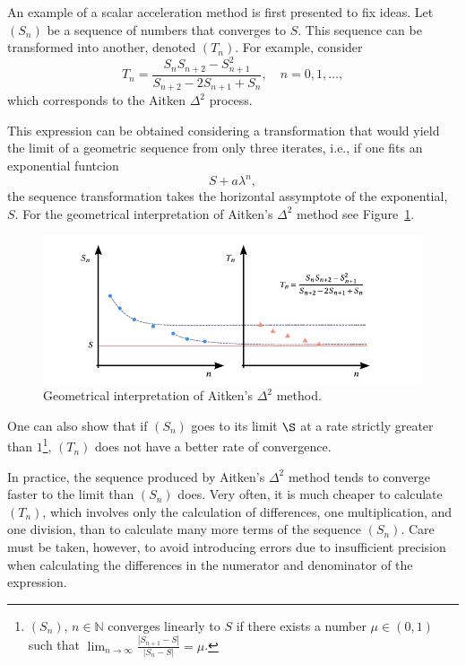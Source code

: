 An example of a scalar acceleration method is first presented to fix ideas.
Let \((S_n)\) be a sequence of numbers that converges to \(S\).
This sequence can be transformed into another, denoted \((T_n)\).
For example, consider
\begin{equation}
  T_n = \frac{S_n S_{n+2} - S^2_{n+1}}{S_{n+2}-2S_{n+1} + S_n},\quad n=0,1,\dots,
\end{equation}
which corresponds to the Aitken \(\Delta^2\) process.

This expression can be obtained considering a transformation that would yield the limit of a geometric sequence from only three iterates, i.e., if one fits an exponential funtcion
\begin{equation}
  S + a \lambda^n,
\end{equation}
the sequence transformation takes the horizontal assymptote of the exponential, \(S\).
For the geometrical interpretation of Aitken's \(\Delta^2\) method see Figure~\ref{fig:aitken}.

\begin{figure}[htbp]
  \includegraphics{figures/aitken}
  \caption{Geometrical interpretation of Aitken's \(\Delta^2\) method.}
  \label{fig:aitken}
\end{figure}

One can also show that if \((S_n)\) goes to its limit \(\S\) at a rate strictly greater than \(1\)\footnote{$(S_{n})$, ${n \in \mathbb{N}}$ converges linearly to $S$ if there exists a number $\mu \in(0,1)$ such that \(\lim_{n \rightarrow \infty} \frac{\left|S_{n+1}-S\right|}{\left|S_{n}-S\right|}=\mu\).}, \((T_n)\) does not have a better rate of convergence.

In practice, the sequence produced by Aitken's \(\Delta^2\) method tends to converge faster to the limit than \((S_n)\) does.
Very often, it is much cheaper to calculate \((T_n)\), which involves only the calculation of differences, one multiplication, and one division, than to calculate many more terms of the sequence \((S_n)\).
Care must be taken, however, to avoid introducing errors due to insufficient precision when calculating the differences in the numerator and denominator of the expression.

